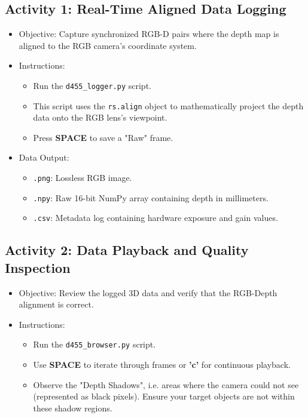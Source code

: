 \documentclass{article}
\begin{document}
\newpage
\subsection*{Activity 1: Real-Time Aligned Data Logging}

\begin{itemize} \item Objective: Capture synchronized RGB-D pairs where the depth map is aligned to the RGB camera's coordinate system. \item Instructions: \begin{itemize} \item Run the \texttt{d455\_logger.py} script. \item This script uses the \texttt{rs.align} object to mathematically project the depth data onto the RGB lens's viewpoint. \item Press \textbf{SPACE} to save a "Raw" frame. \end{itemize} \item Data Output: \begin{itemize} \item \texttt{.png}: Lossless RGB image. \item \texttt{.npy}: Raw 16-bit NumPy array containing depth in millimeters. \item \texttt{.csv}: Metadata log containing hardware exposure and gain values. \end{itemize} \end{itemize}


\subsection*{Activity 2: Data Playback and Quality Inspection}

\begin{itemize} 
\item Objective: Review the logged 3D data and verify that the RGB-Depth alignment is correct. 
\item Instructions: \begin{itemize} 
\item Run the \texttt{d455\_browser.py} script. 
\item Use \textbf{SPACE} to iterate through frames or \textbf{'c'} for continuous playback. 
\item Observe the "Depth Shadows", i.e. areas where the camera could not see (represented as black pixels). Ensure your target objects are not within these shadow regions. 
\end{itemize} 
\end{itemize}
\end{document}
